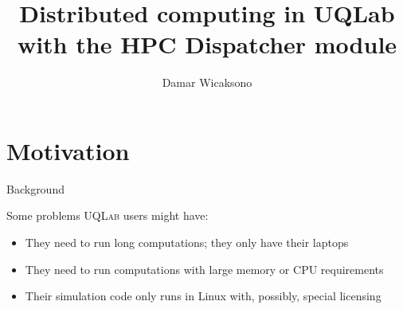 \documentclass[]{rsuqbeamernew}
\title[]{Distributed computing in UQLab\\with the HPC Dispatcher module}
\author[D. Wicaksono]{Damar Wicaksono}
\institute[RSUQ, ETH Z\"urich]{Chair of Risk, Safety and Uncertainty 
Quantification -- ETH Z\"urich}
\date[09.05.2019]
\begin{document}
\section{Motivation}

\begin{frame}{Background}

\begin{block}{Some problems \textsc{UQLab} users might have:}
\begin{itemize}
  \item They need to run long computations; they only have their laptops\\
  \item They need to run computations with large memory or CPU requirements\\
  \item Their simulation code only runs in Linux with, possibly, special licensing
\end{itemize}
\end{block}

\end{frame}
\end{document}
